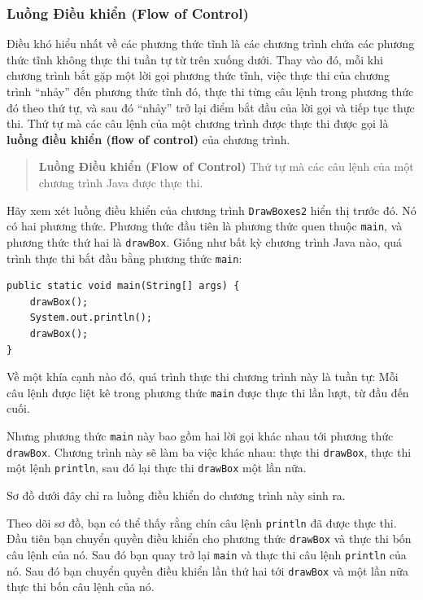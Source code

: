\subsubsection{Luồng Điều khiển (Flow of
Control)}\label{luux1ed3ng-ux111iux1ec1u-khiux1ec3n-flow-of-control}

Điều khó hiểu nhất về các phương thức tĩnh là các chương trình chứa các
phương thức tĩnh không thực thi tuần tự từ trên xuống dưới. Thay vào đó,
mỗi khi chương trình bắt gặp một lời gọi phương thức tĩnh, việc thực thi
của chương trình ``nhảy'' đến phương thức tĩnh đó, thực thi từng câu
lệnh trong phương thức đó theo thứ tự, và sau đó ``nhảy'' trở lại điểm
bắt đầu của lời gọi và tiếp tục thực thi. Thứ tự mà các câu lệnh của một
chương trình được thực thi được gọi là \textbf{luồng điều khiển (flow of
control)} của chương trình.

\begin{quote}
\textbf{Luồng Điều khiển (Flow of Control)} Thứ tự mà các câu lệnh của
một chương trình Java được thực thi.
\end{quote}

Hãy xem xét luồng điều khiển của chương trình \texttt{DrawBoxes2} hiển
thị trước đó. Nó có hai phương thức. Phương thức đầu tiên là phương thức
quen thuộc \texttt{main}, và phương thức thứ hai là \texttt{drawBox}.
Giống như bất kỳ chương trình Java nào, quá trình thực thi bắt đầu bằng
phương thức \texttt{main}:

\begin{verbatim}
public static void main(String[] args) {
    drawBox();
    System.out.println();
    drawBox();
}
\end{verbatim}

Về một khía cạnh nào đó, quá trình thực thi chương trình này là tuần tự:
Mỗi câu lệnh được liệt kê trong phương thức \texttt{main} được thực thi
lần lượt, từ đầu đến cuối.

Nhưng phương thức \texttt{main} này bao gồm hai lời gọi khác nhau tới
phương thức \texttt{drawBox}. Chương trình này sẽ làm ba việc khác nhau:
thực thi \texttt{drawBox}, thực thi một lệnh \texttt{println}, sau đó
lại thực thi \texttt{drawBox} một lần nữa.

Sơ đồ dưới đây chỉ ra luồng điều khiển do chương trình này sinh ra.

Theo dõi sơ đồ, bạn có thể thấy rằng chín câu lệnh \texttt{println} đã
được thực thi. Đầu tiên bạn chuyển quyền điều khiển cho phương thức
\texttt{drawBox} và thực thi bốn câu lệnh của nó. Sau đó bạn quay trở
lại \texttt{main} và thực thi câu lệnh \texttt{println} của nó. Sau đó
bạn chuyển quyền điều khiển lần thứ hai tới \texttt{drawBox} và một lần
nữa thực thi bốn câu lệnh của nó.

